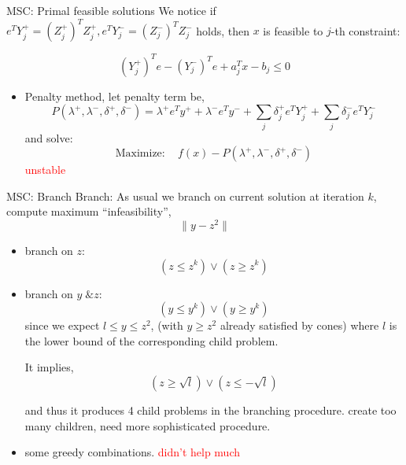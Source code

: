 \begin{frame}{MSC: Primal feasible solutions}
  We notice if \(e^TY^+_j = (Z^+_j)^TZ^+_j,  e^TY^-_j = (Z^-_j)^TZ^-_j\) holds,
  then \(x\) is feasible to \(j\)-th constraint:

  \[(Y^+_j)^Te - (Y^-_j)^Te + a_j^Tx - b_j \le 0\]

  \begin{itemize}
    \item Penalty method, let penalty term be,
          \[P(\lambda^+, \lambda^-, \delta^+, \delta^-)
            = \lambda^+ e^Ty^+ + \lambda^-e^Ty^-
            + \sum_j \delta^+_j e^TY^+_j + \sum_j \delta^-_j e^TY^-_j\]
          and solve:
          \[\mathrm{Maximize: } \quad f(x) - P(\lambda^+, \lambda^-, \delta^+, \delta^-) \]
          \textcolor{red}{unstable}
  \end{itemize}

\end{frame}

\begin{frame}{MSC: Branch}
  Branch:
  As usual we branch on current solution at iteration \(k\), compute maximum ``infeasibility'',
  \[ \|y - z^2\|\]
  \begin{itemize}
    \item branch on \(z\):
          \[ \left(z \le z^k \right)  \vee \left(z \ge z^k \right)  \]
    \item branch on \(y\; \& z\):
          \[ \left(y \le y^k  \right)  \vee \left (y \ge y^k \right)  \]
          since we expect \(l \le y \le z^2\), (with \(y \ge z^2\) already satisfied by cones)
          where \(l\) is the lower bound of the corresponding child problem.

          It implies,
          \[
            \left(z \ge \sqrt{l} \right) \vee \left( z \le -\sqrt{l} \right)
          \]

          and thus it produces 4 child problems in the branching procedure.
          create too many children, need more sophisticated procedure.
    \item some greedy combinations. \textcolor{red}{didn't help much}
  \end{itemize}
\end{frame}

